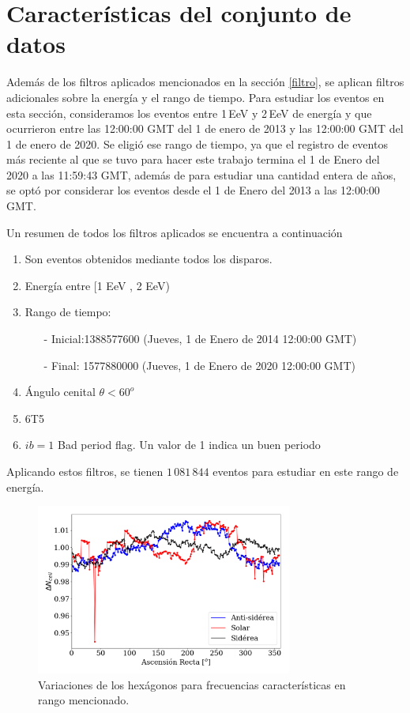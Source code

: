 	\section{Características del conjunto de datos} \label{specs}
	

	Además de los filtros aplicados mencionados en la sección \ref{filtro}, se aplican filtros adicionales sobre la energía y el rango de tiempo. Para estudiar los eventos en esta sección, consideramos los eventos entre 1\,EeV y 2\,EeV de energía y que ocurrieron entre las 12:00:00 GMT del 1 de enero de 2013 y las 12:00:00 GMT del 1 de enero de 2020. Se  eligió ese rango de tiempo, ya que el registro de eventos más reciente al que se tuvo para hacer este trabajo termina el 1 de Enero del 2020  a las 11:59:43 GMT, además de para estudiar una cantidad entera de años, se optó por considerar los eventos desde el 1 de Enero del 2013 a las 12:00:00 GMT.

	Un resumen de todos los filtros aplicados se encuentra a continuación
		\begin{enumerate}
			\item Son eventos obtenidos mediante todos los disparos.
			\item Energía entre  [1 EeV , 2 EeV)
			\item Rango de tiempo:
			\begin{itemize}
				\item[-] Inicial:1388577600 (Jueves, 1 de Enero de 2014 12:00:00 GMT)
				\item[-] Final: 1577880000  (Jueves, 1 de Enero de 2020 12:00:00 GMT)
			\end{itemize}
			\item Ángulo cenital $\theta < 60^o$
			\item 6T5
			\item $ib=1$ Bad period flag. Un valor de 1 indica un buen periodo
		\end{enumerate}
	Aplicando estos filtros, se tienen $1\,081\,844$ eventos para estudiar en este rango de energía.
			
			\begin{figure}[H]
				\centering
				\includegraphics[width=0.75\textwidth]{weights_2013_2020.png}
				\caption{Variaciones de los hexágonos para frecuencias características en rango mencionado. }
			\end{figure}

